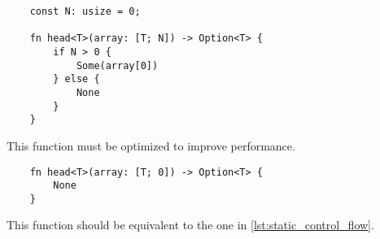 \begin{listing}
    \begin{verbatim}
    const N: usize = 0;

    fn head<T>(array: [T; N]) -> Option<T> {
        if N > 0 {
            Some(array[0])
        } else {
            None
        }
    }
    \end{verbatim}
    \caption{This function must be optimized to improve performance.}
    \label{lst:static_control_flow}
\end{listing}

\begin{listing}
    \begin{verbatim}
    fn head<T>(array: [T; 0]) -> Option<T> {
        None
    }
    \end{verbatim}
    \caption{This function should be equivalent to the one in \ref{lst:static_control_flow}.}
    \label{lst:optimized}
\end{listing}
